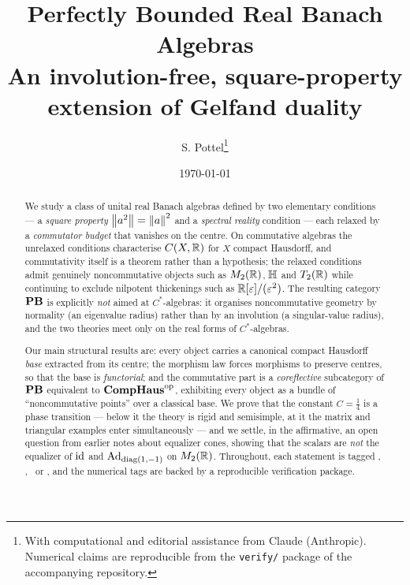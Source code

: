 \documentclass[11pt,a4paper]{article}
\title{Perfectly Bounded Real Banach Algebras\\
\large An involution-free, square-property extension of Gelfand duality}
\author{S. Pottel\thanks{With computational and editorial assistance from Claude
(Anthropic). Numerical claims are reproducible from the \texttt{verify/} package
of the accompanying repository.}}
\date{\today}
\begin{document}
\maketitle

\begin{abstract}
We study a class of unital real Banach algebras defined by two elementary
conditions --- a \emph{square property} $\left\lVert a^2\right\rVert=\left\lVert a\right\rVert^2$ and a
\emph{spectral reality} condition --- each relaxed by a \emph{commutator budget}
that vanishes on the centre.  On commutative algebras the unrelaxed conditions
characterise $C(X,\mathbb{R})$ for $X$ compact Hausdorff, and commutativity itself is a
theorem rather than a hypothesis; the relaxed conditions admit genuinely
noncommutative objects such as $M_2(\mathbb{R})$, $\mathbb{H}$ and $T_2(\mathbb{R})$ while continuing
to exclude nilpotent thickenings such as $\mathbb{R}[\varepsilon]/(\varepsilon^2)$.  The
resulting category $\mathbf{PB}$ is explicitly \emph{not} aimed at $C^*$-algebras: it
organises noncommutative geometry by normality (an eigenvalue radius) rather
than by an involution (a singular-value radius), and the two theories meet only
on the real forms of $C^*$-algebras.

Our main structural results are: every object carries a canonical compact
Hausdorff \emph{base} extracted from its centre; the morphism law forces
morphisms to preserve centres, so that the base is \emph{functorial}; and the
commutative part is a \emph{coreflective} subcategory of $\mathbf{PB}$ equivalent to
$\mathbf{CompHaus}^{\mathrm{op}}$, exhibiting every object as a bundle of ``noncommutative points''
over a classical base.  We prove that the constant $C=\tfrac14$ is a phase
transition --- below it the theory is rigid and semisimple, at it the matrix and
triangular examples enter simultaneously --- and we settle, in the affirmative,
an open question from earlier notes about equalizer cones, showing that the
scalars are \emph{not} the equalizer of $\operatorname{id}$ and $\operatorname{Ad}_{\mathrm{diag}(1,-1)}$ on
$M_2(\mathbb{R})$.  Throughout, each statement is tagged \statusproved,
\statusnum, \statusconj\ or \statusopen, and the numerical tags are backed by a
reproducible verification package.
\end{abstract}

\tableofcontents


















\end{document}

